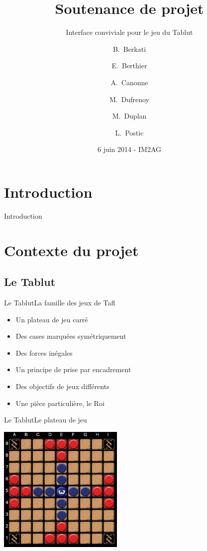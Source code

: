 \documentclass{beamer}
\title[UE PROG6] %
{Soutenance de projet}
\subtitle
{Interface conviviale pour le jeu du Tablut} %
\author[] %
{B.~Berkati \and E.~Berthier \and A.~Canonne \and M.~Dufrenoy \and M.~Duplan \and L.~Postic}
\institute[Universities of Somewhere and Elsewhere] %
{
  IM2AG - Département STS Informatique\\
  Université Joseph Fourier
 }
\date[UET Animation scientifique] %
{6 juin 2014 - IM2AG}
\begin{document}
\begin{frame}
  \titlepage
\end{frame}






\section{Introduction}

\begin{frame}{Introduction}
  \tableofcontents
\end{frame}

\section{Contexte du projet}

\subsection{Le Tablut}

\begin{frame}{Le Tablut}{La famille des jeux de Tafl}
  \begin{itemize}
  \item Un plateau de jeu carré
	\item Des cases marquées symétriquement
	\item Des forces inégales
	\item Un principe de prise par encadrement
	\item Des objectifs de jeux différents
	\item Une pièce particulière, le Roi
  \end{itemize}
\end{frame}

\begin{frame}{Le Tablut}{Le plateau de jeu}
 \begin{center}
\includegraphics[width=6cm]{plateau.jpg}
\end{center}
\end{frame}
\end{document}

